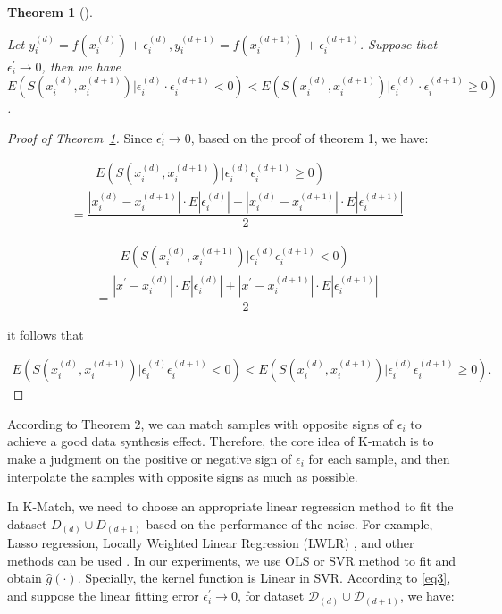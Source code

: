 \documentclass[sn-mathphys,Numbered]{sn-jnl}%
\theoremstyle{thmstyleone}%
\newtheorem{theorem}{Theorem}%
\theoremstyle{thmstyletwo}%
\theoremstyle{thmstylethree}%
\begin{document}
\begin{theorem}[]\label{thm2}

Let $y_i^{(d)}=f(x_i^{(d)})+\epsilon_i^{(d)},y_i^{(d+1)}=f(x_i^{(d+1)})+\epsilon_i^{(d+1)}$. Suppose that $\epsilon_i^\prime\rightarrow0$, then we have $E\left(S(x_i^{(d)},x_i^{(d+1)})|\epsilon_i^{(d)}\cdot\epsilon_i^{(d+1)}<0 \right)<E\left(S(x_i^{(d)},x_i^{(d+1)})|\epsilon_i^{(d)}\cdot\epsilon_i^{(d+1)}\ge0 \right)$.

\end{theorem}

\begin{proof}[Proof of Theorem~{\upshape\ref{thm2}}]

Since $\epsilon_i^\prime\rightarrow0$, based on the proof of theorem 1, we have:

\begin{align*}
&\qquad E\left(S(x_i^{(d)},x_i^{(d+1)})|\epsilon_i^{(d)}\epsilon_i^{(d+1)}\ge0 \right)\\
&=\dfrac{|x_i^{(d)}-x_i^{(d+1)}|\cdot E|\epsilon_i^{(d)}|+|x_i^{(d)}-x_i^{(d+1)}|\cdot E|\epsilon_i^{(d+1)}|}{2}
\end{align*}


\begin{align*} 
&\qquad E\left(S(x_i^{(d)},x_i^{(d+1)})|\epsilon_i^{(d)}\epsilon_i^{(d+1)}<0 \right)\\ 
&=\dfrac{|x^\prime-x_i^{(d)}|\cdot E|\epsilon_i^{(d)}|+|x^\prime-x_i^{(d+1)}|\cdot E|\epsilon_i^{(d+1)}|}{2}
\end{align*}

it follows that 

\begin{align*}
E\left(S(x_i^{(d)},x_i^{(d+1)})|\epsilon_i^{(d)}\epsilon_i^{(d+1)}<0 \right)<E\left(S(x_i^{(d)},x_i^{(d+1)})|\epsilon_i^{(d)}\epsilon_i^{(d+1)}\ge0 \right).
\end{align*}

\end{proof}

According to Theorem 2, we can match samples with opposite signs of $\epsilon_i$ to achieve a good data synthesis effect. Therefore, the core idea of K-match is to make a judgment on the positive or negative sign of $\epsilon_i$ for each sample, and then interpolate the samples with opposite signs as much as possible.

In K-Match, we need to choose an appropriate linear regression method to fit the dataset $D_{(d)}\cup D_{(d+1)}$ based on the performance of the noise. For example, Lasso regression, Locally Weighted Linear Regression (LWLR) \cite{bib23}, and other methods can be used \cite{bib24,bib25}. In our experiments, we use OLS or SVR method to fit and obtain $\hat{g}(\cdot)$. Specially, the kernel function is Linear in SVR. According to \eqref{eq3}, and suppose the linear fitting error $\epsilon_i^\prime\rightarrow0$, for dataset $\mathcal{D}_{(d)}\cup\mathcal{D}_{(d+1)}$, we have:
\end{document}
